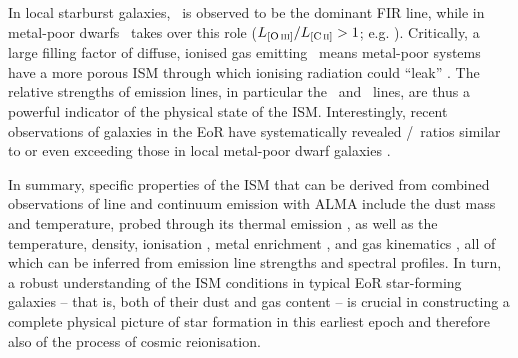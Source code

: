 In local starburst galaxies, \CII\ is observed to be the dominant FIR line, while in metal-poor dwarfs \OIIIf\ takes over this role ($L_\OIIIf/L_\CII > 1$; e.g. \citealt{2020ApJ...896...93H}). Critically, a large filling factor of diffuse, ionised gas emitting \OIIILam\ means metal-poor systems have a more porous ISM through which ionising radiation could ``leak'' \citep{2015A&A...578A..53C}. The relative strengths of emission lines, in particular the \OIIIf\ and \CII\ lines, are thus a powerful indicator of the physical state of the ISM. Interestingly, recent observations of galaxies in the EoR have systematically revealed \OIIIf/\CII\ ratios similar to or even exceeding those in local metal-poor dwarf galaxies \citep[e.g.][]{2020MNRAS.499.5136C}.

In summary, specific properties of the ISM that can be derived from combined observations of line and continuum emission with ALMA include the dust mass and temperature, probed through its thermal emission \citep[e.g.][]{2020MNRAS.493.4294B, 2021MNRAS.508L..58B, 2022ApJ...928...31S}, as well as the temperature, density, ionisation \citep[e.g.][]{2019MNRAS.489....1F, 2019MNRAS.487.1689P, 2021MNRAS.505.5543V}, metal enrichment \citep[e.g.][]{2015ApJ...813...36V}, and gas kinematics \citep[e.g.][]{2021MNRAS.507.3540J}, all of which can be inferred from emission line strengths and spectral profiles. In turn, a robust understanding of the ISM conditions in typical EoR star-forming galaxies -- that is, both of their dust and gas content -- is crucial in constructing a complete physical picture of star formation in this earliest epoch and therefore also of the process of cosmic reionisation.

